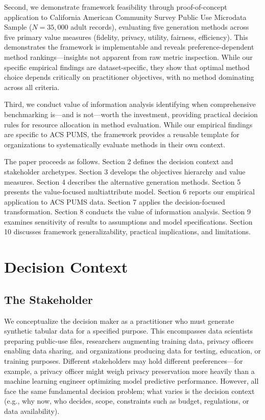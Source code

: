\documentclass[12pt,a4paper]{article}
\begin{document}
Second, we demonstrate framework feasibility through proof-of-concept application to California American Community Survey Public Use Microdata Sample ($N=35{,}000$ adult records), evaluating five generation methods across five primary value measures (fidelity, privacy, utility, fairness, efficiency). This demonstrates the framework is implementable and reveals preference-dependent method rankings---insights not apparent from raw metric inspection. While our specific empirical findings are dataset-specific, they show that optimal method choice depends critically on practitioner objectives, with no method dominating across all criteria.

Third, we conduct value of information analysis identifying when comprehensive benchmarking is---and is not---worth the investment, providing practical decision rules for resource allocation in method evaluation. While our empirical findings are specific to ACS PUMS, the framework provides a reusable template for organizations to systematically evaluate methods in their own context.

The paper proceeds as follows. Section 2 defines the decision context and stakeholder archetypes. Section 3 develops the objectives hierarchy and value measures. Section 4 describes the alternative generation methods. Section 5 presents the value-focused multiattribute model. Section 6 reports our empirical application to ACS PUMS data. Section 7 applies the decision-focused transformation. Section 8 conducts the value of information analysis. Section 9 examines sensitivity of results to assumptions and model specifications. Section 10 discusses framework generalizability, practical implications, and limitations.

\section{Decision Context}

\subsection{The Stakeholder}

We conceptualize the decision maker as a practitioner who must generate synthetic tabular data for a specified purpose. This encompasses data scientists preparing public-use files, researchers augmenting training data, privacy officers enabling data sharing, and organizations producing data for testing, education, or training purposes. Different stakeholders may hold different preferences---for example, a privacy officer might weigh privacy preservation more heavily than a machine learning engineer optimizing model predictive performance. However, all face the same fundamental decision problem; what varies is the decision context (e.g., why now, who decides, scope, constraints such as budget, regulations, or data availability).
\end{document}
